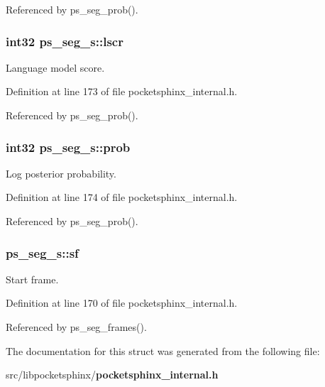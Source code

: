 Referenced by ps\+\_\+seg\+\_\+prob().

\subsubsection[{lscr}]{\setlength{\rightskip}{0pt plus 5cm}int32 ps\+\_\+seg\+\_\+s\+::lscr}\label{structps__seg__s_a69e605f422eeed1a9c67437e8ddd8b08}


Language model score. 



Definition at line 173 of file pocketsphinx\+\_\+internal.\+h.



Referenced by ps\+\_\+seg\+\_\+prob().

\subsubsection[{prob}]{\setlength{\rightskip}{0pt plus 5cm}int32 ps\+\_\+seg\+\_\+s\+::prob}\label{structps__seg__s_ae683244d90d0a5339930b47757778432}


Log posterior probability. 



Definition at line 174 of file pocketsphinx\+\_\+internal.\+h.



Referenced by ps\+\_\+seg\+\_\+prob().

\subsubsection[{sf}]{ ps\+\_\+seg\+\_\+s\+::sf}\label{structps__seg__s_a885a599726cd0efba573d106d016e6e2}


Start frame. 



Definition at line 170 of file pocketsphinx\+\_\+internal.\+h.



Referenced by ps\+\_\+seg\+\_\+frames().



The documentation for this struct was generated from the following file\+:\begin{DoxyCompactItemize}
\item 
src/libpocketsphinx/{\bf pocketsphinx\+\_\+internal.\+h}\end{DoxyCompactItemize}
